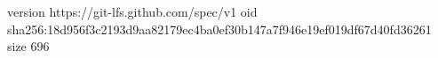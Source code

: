 version https://git-lfs.github.com/spec/v1
oid sha256:18d956f3c2193d9aa82179ec4ba0ef30b147a7f946e19ef019df67d40fd36261
size 696
